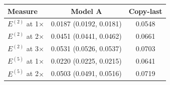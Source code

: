 \begin{tabular}{lcc}
\toprule
Measure & Model A & Copy-last \\
\midrule
$E^{(2)}$ at 1$\times$ & 0.0187 (0.0192, 0.0181) & 0.0548 \\
$E^{(2)}$ at 2$\times$ & 0.0451 (0.0441, 0.0462) & 0.0661 \\
$E^{(2)}$ at 3$\times$ & 0.0531 (0.0526, 0.0537) & 0.0703 \\
$E^{(5)}$ at 1$\times$ & 0.0220 (0.0225, 0.0215) & 0.0641 \\
$E^{(5)}$ at 2$\times$ & 0.0503 (0.0491, 0.0516) & 0.0719 \\
\bottomrule
\end{tabular}
